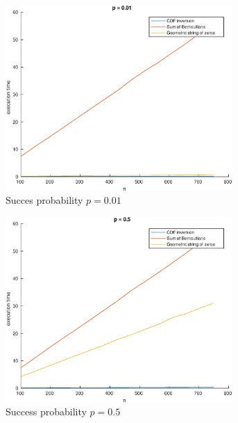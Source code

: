 \documentclass[a4paper,oneside]{article}
\begin{document}
\begin{figure}[htbp]
  \centering
  \begin{subfigure}{0.5\textwidth}
    \centering
    \includegraphics[width=0.95\textwidth]{binomial_gen_1}
    \caption{Succes probability $p=0.01$}
    \label{plot:binomial_1}
  \end{subfigure}%
  \begin{subfigure}{0.5\textwidth}
    \centering
    \includegraphics[width=0.95\textwidth]{binomial_gen_2}
    \caption{Success probability $p=0.5$}
    \label{plot:binomial_2}
  \end{subfigure}
  \begin{subfigure}{0.5\textwidth}

\end{subfigure}
\end{figure}
\end{document}
